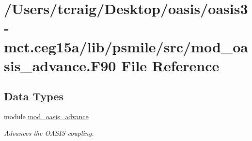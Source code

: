 \hypertarget{mod__oasis__advance_8_f90}{\section{/\+Users/tcraig/\+Desktop/oasis/oasis3-\/mct.ceg15a/lib/psmile/src/mod\+\_\+oasis\+\_\+advance.F90 File Reference}
\label{mod__oasis__advance_8_f90}
}
\subsection*{Data Types}
\begin{DoxyCompactItemize}
\item 
module \hyperlink{classmod__oasis__advance}{mod\+\_\+oasis\+\_\+advance}
\begin{DoxyCompactList}\small\item\em Advances the O\+A\+S\+I\+S coupling. \end{DoxyCompactList}\end{DoxyCompactItemize}
